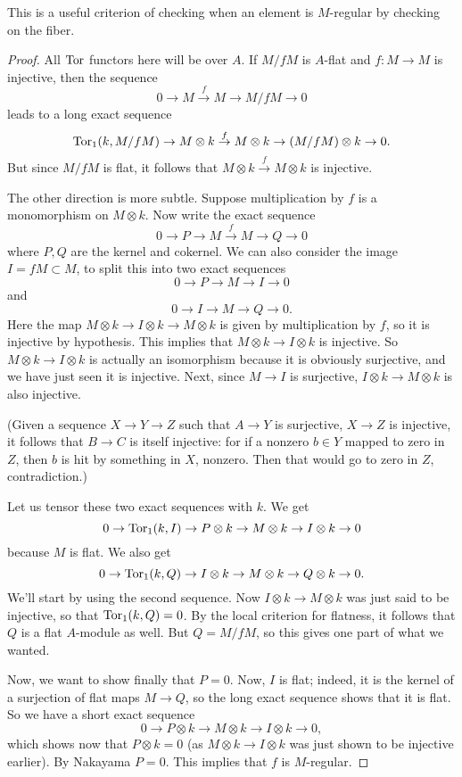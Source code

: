 This is  a useful criterion of checking when an element is $M$-regular by
checking on the fiber.
\begin{proof} All $\operatorname{Tor}$ functors here will be over $A$. 
If $M/fM$ is $A$-flat and $f: M \to M$ is injective, then the sequence
\[ 0 \to M \stackrel{f}{\to} M \to M/fM \to 0 \]
leads to a long exact sequence
\[ \operatorname{Tor}_1(k, M/fM) \to M \otimes k \stackrel{f}{\to} M \otimes k \to (M/fM)
\otimes k \to 0. \]
But since $M/fM$ is flat, it follows that $M \otimes k \stackrel{f}{\to} M
\otimes k$ is injective.

The other direction is more subtle. Suppose multiplication by $f$ is a
monomorphism on $M \otimes k$. Now write the exact sequence
\[ 0 \to P \to M \stackrel{f}{\to} M \to Q \to 0 \]
where $P, Q$ are the kernel and cokernel. 
We can also consider the image $I = fM \subset M$, to split this into two
exact sequences
\[ 0 \to P \to M \to I \to 0  \]
and 
\[ 0 \to I \to M \to Q \to 0.  \]
Here the map $M \otimes k \to I \otimes k \to M \otimes k$ is given by
multiplication by $f$, so it is injective by hypothesis. This implies that $M \otimes k \to I
\otimes k$ is injective. So $M \otimes k \to I \otimes k$ is actually an isomorphism because it
is obviously surjective, and we have just seen it is injective.
Next, since $M \to I$ is surjective, $I \otimes k \to M
\otimes k$ is also injective.

(Given a sequence $X \to Y \to Z$ such that $A
\to Y$ is surjective, $X \to Z$ is injective, it follows that $B \to C$ is
itself injective: for if a nonzero $b \in Y$ mapped to zero in $Z$, then $b$ is hit by
something in $X$, nonzero. Then that would go to zero in $Z$, contradiction.)

Let us tensor these two exact sequences with $k$. We get
\[ 0 \to  \operatorname{Tor}_1(k, I) \to P \otimes k \to M  \otimes k \to I \otimes k \to 0   \]
because $M$ is flat. We also get
\[ 0 \to  \operatorname{Tor}_1(k, Q) \to I \otimes k \to M  \otimes k \to Q \otimes k \to 0
.\]
We'll start by using the second sequence. Now $I \otimes k \to M \otimes k$
was just said to be injective, so that $\operatorname{Tor}_1(k, Q) = 0$. By the local
criterion for flatness, it follows that $Q$ is a flat 
$A$-module as well. 
But $Q = M/fM$, so this gives one part of what we wanted.

Now, we want to show finally that $P = 0$. 
Now, $I$ is flat; indeed, it is the kernel of a surjection of flat maps $M \to
Q$, so the long exact sequence shows that it is flat. So we have a short exact
sequence
\[ 0 \to P \otimes k \to M \otimes k \to I \otimes k \to 0,  \]
which shows now that $P \otimes k  = 0$ (as $M \otimes k \to I \otimes k$ was
just shown to be injective earlier). By Nakayama $P = 0$.
This implies that $f$ is $M$-regular.
\end{proof}

